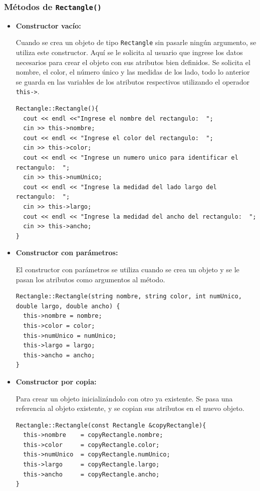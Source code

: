 \subsubsection{Métodos de \texttt{Rectangle()}}
\begin{itemize}
\item \textbf{Constructor vacío:}

	Cuando se crea un objeto de tipo \texttt{Rectangle} sin pasarle ningún argumento, se utiliza este constructor. Aquí se le solicita al usuario que ingrese los datos necesarios para crear el objeto con sus atributos bien definidos. Se solicita el nombre, el color, el número único y las medidas de los lado, todo lo anterior se guarda en las variables de los atributos respectivos utilizando el operador \texttt{this->}.
    \begin{verbatim}
Rectangle::Rectangle(){
  cout << endl <<"Ingrese el nombre del rectangulo:  ";
  cin >> this->nombre;
  cout << endl << "Ingrese el color del rectangulo:  ";
  cin >> this->color;
  cout << endl << "Ingrese un numero unico para identificar el rectangulo:  ";
  cin >> this->numUnico;
  cout << endl << "Ingrese la medidad del lado largo del rectangulo:  ";
  cin >> this->largo;
  cout << endl << "Ingrese la medidad del ancho del rectangulo:  ";
  cin >> this->ancho;
}   
    \end{verbatim}
    
\item \textbf{Constructor con parámetros:}

	El constructor con parámetros se utiliza cuando se crea un objeto y se le pasan los atributos como argumentos al método.
	\begin{verbatim}
Rectangle::Rectangle(string nombre, string color, int numUnico, double largo, double ancho) {
  this->nombre = nombre;
  this->color = color;
  this->numUnico = numUnico;
  this->largo = largo;
  this->ancho = ancho;
}
   \end{verbatim}

\item \textbf{Constructor por copia:}

Para crear un objeto inicializándolo con otro ya existente. Se pasa una referencia al objeto existente, y se copian sus atributos en el nuevo objeto.

\begin{verbatim}
Rectangle::Rectangle(const Rectangle &copyRectangle){
  this->nombre    = copyRectangle.nombre;
  this->color     = copyRectangle.color;
  this->numUnico  = copyRectangle.numUnico;
  this->largo     = copyRectangle.largo;
  this->ancho     = copyRectangle.ancho;
}
\end{verbatim}


\end{itemize}
